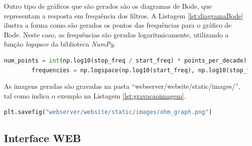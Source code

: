 Outro tipo de gráficos que são gerados são os diagramas de Bode, que representam a resposta em frequência dos filtros. A Listagem \ref{lst:diagramaBode} ilustra a forma como são gerados os pontos das frequências para o gráfico de Bode. Neste caso, as frequências são geradas logaritmicamente, utilizando a função \textit{logspace} da biblioteca \textit{NumPy}.

\begin{minipage}{0.9\linewidth}
	\begin{lstlisting}[language=Python,escapechar=|, caption=Filtros - Diagrama de \textit{Bode}, label=lst:diagramaBode]
		num_points = int(np.log10(stop_freq / start_freq) * points_per_decade)
		frequencies = np.logspace(np.log10(start_freq), np.log10(stop_freq), num=num_points)	
	\end{lstlisting}
\end{minipage}

As imagens geradas são gravadas na pasta ``webserver/website/static/images/'', tal como indica o exemplo na Listagem \ref{lst:gravacaoimagem}. 

\begin{minipage}{0.9\linewidth}
	\begin{lstlisting}[language=Python,escapechar=|, caption=Gravação do gráfico, label=lst:gravacaoimagem]
	    plt.savefig("webserver/website/static/images/ohm_graph.png")	
	\end{lstlisting}
\end{minipage}

\subsection{Interface WEB}
\label{sec:interfaceweb}




